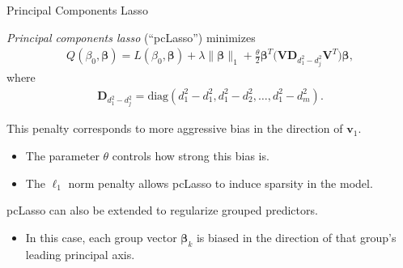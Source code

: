 \documentclass[8pt]{beamer}
\newcommand{\mys}{\vspace{0.5cm} \pause
}
\begin{document}
\begin{frame}{\color{white} Principal Components Lasso}

\textit{Principal components lasso} (``pcLasso'') minimizes
\begin{align}
    \label{pclasso}
    Q(\beta_0, \bm{\beta}) = L(\beta_0, \bm{\beta}) + \lambda \| \bm{\beta} \|_1 + \frac{\theta}{2} \bm{\beta}^T \Big( \mathbf{V} \mathbf{D}_{d_1^2 - d_j^2} \mathbf{V}^T \Big) \bm{\beta},
\end{align}
where 
\begin{align}
    \label{pclassopenaltymatrix}
    \mathbf{D}_{d_1^2 - d_j^2} = \mathrm{diag}(d_1^2 - d_1^2, d_1^2 - d_2^2, \ldots, d_1^2 - d_m^2).
\end{align} \mys

This penalty corresponds to more aggressive bias in the direction of $\bm{v}_1$.
\begin{itemize}
    \item The parameter $\theta$ controls how strong this bias is.
    \item The $\ell_1$ norm penalty allows pcLasso to induce sparsity in the model.
\end{itemize} \mys

pcLasso can also be extended to regularize grouped predictors.
\begin{itemize}
    \item In this case, each group vector $\bm{\beta}_k$ is biased in the direction of that group's leading principal axis.
\end{itemize}
    
\end{frame}
\end{document}
